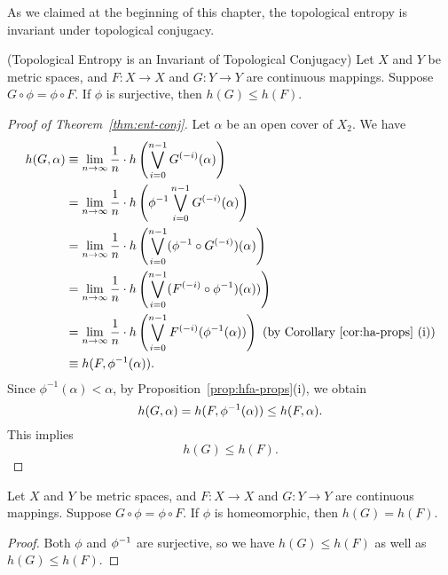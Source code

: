 \documentclass[10pt,twoside,draft]{book}
\begin{document}
As we claimed at the beginning of this chapter, the topological entropy is invariant under topological conjugacy.
\begin{theorem}
  (Topological Entropy is an Invariant of Topological Conjugacy)
  Let $X$ and $Y$ be metric spaces, and $F: X \to X$ and $G: Y \to Y$ are continuous mappings.
  Suppose $G\circ \phi = \phi \circ F$.
  If $\phi$ is surjective, then $h(G) \leq h(F)$.
  \label{thm:ent-conj}
  \begin{proof}[Proof of Theorem~\ref{thm:ent-conj}]
    Let $\alpha$ be an open cover of $X_2$.
    We have
    \begin{align*}
      h(G, \alpha)
      &\equiv \lim\limits_{n \to \infty} \frac{1}{n} \cdot h \left ( \bigvee\limits_{i = 0}^{n-1} G^{(-i)}(\alpha) \right ) \\
      &= \lim\limits_{n \to \infty} \frac{1}{n} \cdot h \left ( \phi^{-1} \bigvee\limits_{i = 0}^{n-1} G^{(-i)} (\alpha) \right ) \\
      &= \lim\limits_{n \to \infty} \frac{1}{n} \cdot h \left ( \bigvee\limits_{i = 0}^{n-1} (\phi^{-1} \circ G^{(-i)}) (\alpha) \right ) \\
      &= \lim\limits_{n \to \infty} \frac{1}{n} \cdot h \left (  \bigvee\limits_{i = 0}^{n-1} (F^{(-i)} \circ \phi^{-1}) (\alpha)) \right ) \\
      &= \lim\limits_{n \to \infty} \frac{1}{n} \cdot h \left ( \bigvee\limits_{i = 0}^{n-1} F^{(-i)} (\phi^{-1} (\alpha)) \right ) \mbox{ (by Corollary~\ref{cor:ha-props} (i))} \\
      &\equiv h(F, \phi^{-1}(\alpha)).
    \end{align*}
    Since $\phi^{-1}(\alpha) < \alpha$, by Proposition~\ref{prop:hfa-props}(i), we obtain
    \begin{equation*}
      h(G,\alpha) 
      = h(F,\phi^{-1}(\alpha))
      \leq h(F, \alpha).
    \end{equation*}
    This implies
    \begin{equation*}
      h(G) \leq h(F).
    \end{equation*}
  \end{proof}
\end{theorem}
\begin{corollary}
  Let $X$ and $Y$ be metric spaces, and $F: X \to X$ and $G: Y \to Y$ are continuous mappings.
  Suppose $G\circ \phi = \phi \circ F$.
  If $\phi$ is homeomorphic, then $h(G) = h(F)$.
\begin{proof}
  Both $\phi$ and $\phi^{-1}$ are surjective, so we have $h(G) \leq h(F)$ as well as $h(G) \leq h(F)$.
\end{proof}
\end{corollary}
\end{document}
